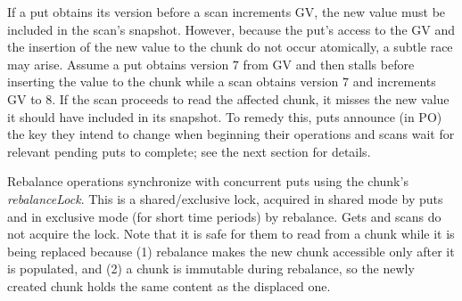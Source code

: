 \documentclass[sigplan,10pt]{acmart}
\newcommand{\code}[1]{\textsf{\fontsize{9}{11}\selectfont #1}}
\newcommand{\remove}[1]{}
\begin{document}
If a put obtains its version before a scan increments GV, the new value must be included in the scan's snapshot. 
However, because the put's access to the GV and the insertion of the new value to the chunk do not occur atomically,
a subtle race may arise. Assume a put obtains version $7$ from GV and then stalls before
inserting the value to the chunk while a scan obtains version $7$ and increments GV to $8$. If the scan proceeds 
to read the affected chunk, it misses the new value it should have included in its snapshot.
%
To remedy this, puts announce (in PO) the key they intend to change when beginning their operations and scans wait for relevant pending puts to complete; see the next section for details.


\remove{
A put operation takes hold of the chunk's \code{rebalanceLock} in shared mode, 
then publishes itself in  PO, gets a version by reading GV, updates its version in PO,  
and releases the chunk lock. 
}


\remove{
  The per-chunk PPA is used to synchronize pending puts  with ongoing scans. It holds an entry for every active inserting thread, consisting of a \code{key},  a \code{version}, 
 a \code{done} bit indicating whether the update has been completed, and a monotonically increasing 
 \code{counter} to avoid ABA scenarios.

A put operation first registers itself in the appropriate chunk's PPA entry with the key it intends to put.
It then reads GV and sets the version field in its PPA entry to the read version. 
After completing the actual put (in the appropriate munk and/or funk), it sets the \code{done} bit.
A scan, in turn, scans the PPA in addition to the chunk's data 
(\code{karray},  \code{log} or \code{SSTable}  ). If it finds a pending put
of a relevant key that is not yet associated with a version, it waits for the version to be assigned. 
Once the version is assigned, if it is the highest version for this key that does not exceed its scan time, 
it waits for the \code{done} bit to be true or for the the \code{version} to change again, at  which point
it reads the value from the appropriate munk or funk.
}

Rebalance operations synchronize with concurrent puts using the chunk's \emph{rebalanceLock}.
This is a shared/exclusive lock, acquired in shared mode by puts and in exclusive mode (for short time periods)
by rebalance. 
Gets and scans do not acquire the lock. Note that it is safe for them to read from a chunk while it is being replaced because
(1) rebalance makes the new chunk accessible only after it is populated, and (2) a chunk is immutable during rebalance, so 
the newly created chunk holds the same content as the displaced one.
\end{document}
